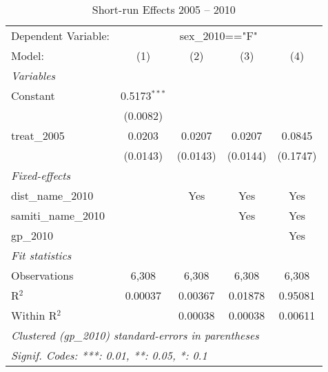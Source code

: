 
\begin{table}[htbp]
   \caption{Short-run Effects 2005 -- 2010}
   \centering
   \begin{tabular}{lcccc}
      \tabularnewline \midrule \midrule
      Dependent Variable: & \multicolumn{4}{c}{sex\_2010=="F"}\\
      Model:               & (1)            & (2)      & (3)      & (4)\\  
      \midrule
      \emph{Variables}\\
      Constant             & 0.5173$^{***}$ &          &          &   \\   
                           & (0.0082)       &          &          &   \\   
      treat\_2005          & 0.0203         & 0.0207   & 0.0207   & 0.0845\\   
                           & (0.0143)       & (0.0143) & (0.0144) & (0.1747)\\   
      \midrule
      \emph{Fixed-effects}\\
      dist\_name\_2010     &                & Yes      & Yes      & Yes\\  
      samiti\_name\_2010   &                &          & Yes      & Yes\\  
      gp\_2010             &                &          &          & Yes\\  
      \midrule
      \emph{Fit statistics}\\
      Observations         & 6,308          & 6,308    & 6,308    & 6,308\\  
      R$^2$                & 0.00037        & 0.00367  & 0.01878  & 0.95081\\  
      Within R$^2$         &                & 0.00038  & 0.00038  & 0.00611\\  
      \midrule \midrule
      \multicolumn{5}{l}{\emph{Clustered (gp\_2010) standard-errors in parentheses}}\\
      \multicolumn{5}{l}{\emph{Signif. Codes: ***: 0.01, **: 0.05, *: 0.1}}\\
   \end{tabular}
\end{table}



